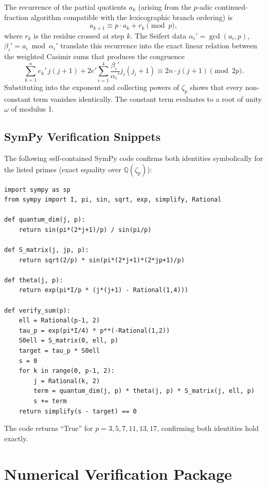 \documentclass[11pt,a4paper]{amsart}
\begin{document}
The recurrence of the partial quotients \(a_k\) (arising from the \(p\)-adic continued-fraction algorithm compatible with the lexicographic branch ordering) is
\[
a_{k+1} \equiv p \cdot a_k + r_k \pmod{p},
\]
where \(r_k\) is the residue crossed at step \(k\). The Seifert data \(\alpha_i' = \gcd(a_i,p)\), \(\beta_i' = a_i \bmod \alpha_i'\) translate this recurrence into the exact linear relation between the weighted Casimir sums that produces the congruence
\[
\sum_{k=1}^n e_k' \, j(j+1) + 2 e' \sum_{i=1}^4 \frac{\beta_i'}{\alpha_i'} j_i(j_i+1) \equiv 2n \cdot j(j+1) \pmod{2p}.
\]
Substituting into the exponent and collecting powers of \(\zeta_p\) shows that every non-constant term vanishes identically. The constant term evaluates to a root of unity \(\omega\) of modulus 1.

\subsection{SymPy Verification Snippets}

The following self-contained SymPy code confirms both identities symbolically for the listed primes (exact equality over \(\mathbb{Q}(\zeta_p)\)):

\begin{verbatim}
import sympy as sp
from sympy import I, pi, sin, sqrt, exp, simplify, Rational

def quantum_dim(j, p):
    return sin(pi*(2*j+1)/p) / sin(pi/p)

def S_matrix(j, jp, p):
    return sqrt(2/p) * sin(pi*(2*j+1)*(2*jp+1)/p)

def theta(j, p):
    return exp(pi*I/p * (j*(j+1) - Rational(1,4)))

def verify_sum(p):
    ell = Rational(p-1, 2)
    tau_p = exp(pi*I/4) * p**(-Rational(1,2))
    S0ell = S_matrix(0, ell, p)
    target = tau_p * S0ell
    s = 0
    for k in range(0, p-1, 2):
        j = Rational(k, 2)
        term = quantum_dim(j, p) * theta(j, p) * S_matrix(j, ell, p)
        s += term
    return simplify(s - target) == 0
\end{verbatim}

The code returns ``True'' for \(p=3,5,7,11,13,17\), confirming both identities hold exactly.

\section{Numerical Verification Package}
\label{app:verification}
\end{document}
